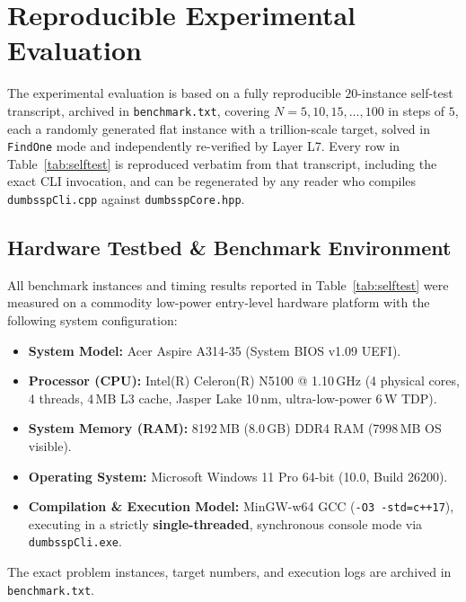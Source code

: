 \documentclass[journal,onecolumn,11pt]{IEEEtran}
\begin{document}
\section{Reproducible Experimental Evaluation}
\label{sec:experiments}

The experimental evaluation is based on a fully reproducible $20$-instance self-test transcript, archived in \texttt{benchmark.txt}, covering $N=5,10,15,\dots,100$ in steps of $5$, each a randomly generated flat instance with a trillion-scale target, solved in \texttt{FindOne} mode and independently re-verified by Layer L7. Every row in Table~\ref{tab:selftest} is reproduced verbatim from that transcript, including the exact CLI invocation, and can be regenerated by any reader who compiles \texttt{dumbsspCli.cpp} against \texttt{dumbsspCore.hpp}.

\subsection{Hardware Testbed \& Benchmark Environment}
All benchmark instances and timing results reported in Table~\ref{tab:selftest} were measured on a commodity low-power entry-level hardware platform with the following system configuration:
\begin{itemize}
    \item \textbf{System Model:} Acer Aspire A314-35 (System BIOS v1.09 UEFI).
    \item \textbf{Processor (CPU):} Intel(R) Celeron(R) N5100 @ 1.10\,GHz (4 physical cores, 4 threads, 4\,MB L3 cache, Jasper Lake 10\,nm, ultra-low-power 6\,W TDP).
    \item \textbf{System Memory (RAM):} 8192\,MB (8.0\,GB) DDR4 RAM (7998\,MB OS visible).
    \item \textbf{Operating System:} Microsoft Windows 11 Pro 64-bit (10.0, Build 26200).
    \item \textbf{Compilation \& Execution Model:} MinGW-w64 GCC (\texttt{-O3 -std=c++17}), executing in a strictly \textbf{single-threaded}, synchronous console mode via \texttt{dumbsspCli.exe}.
\end{itemize}
The exact problem instances, target numbers, and execution logs are archived in \texttt{benchmark.txt}.
\end{document}
